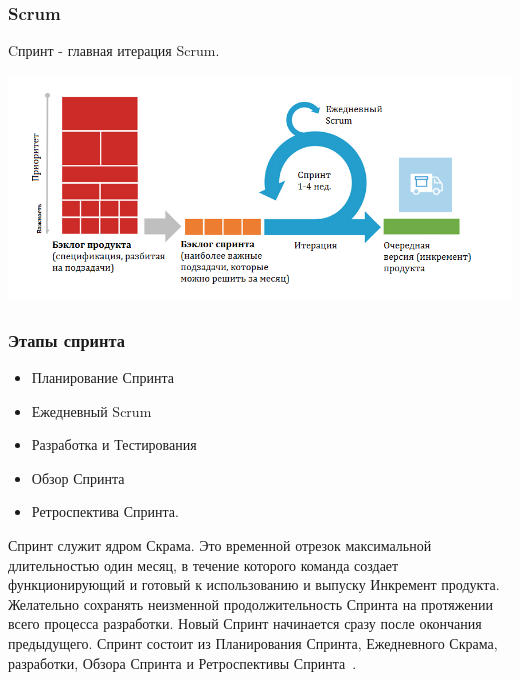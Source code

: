 \documentclass{../industrial-development}
\begin{document}
\begin{frame} \frametitle{Scrum}
Cпринт - главная итерация Scrum.
\centerline{\includegraphics[height=0.6\textheight]{scrum.png}}
\end{frame} 


\begin{frame} \frametitle {Этапы спринта}
\begin{flushright}
\begin{itemize}
\item Планирование Спринта
\item Ежедневный Scrum
\item Разработка и Тестирования
\item Обзор Спринта
\item Ретроспектива Спринта. 
\end {itemize}
\end{flushright}
\end{frame}
\lecturenotes
\begin {block}
Спринт служит ядром Скрама. Это временной отрезок максимальной  длительностью один месяц, в течение которого      команда создает функционирующий и  готовый к использованию и выпуску Инкремент продукта. Желательно сохранять неизменной продолжительность Спринта на протяжении всего  процесса разработки. Новый Спринт начинается сразу после окончания предыдущего. Спринт состоит из Планирования Спринта, Ежедневного Скрама, разработки, Обзора Спринта и Ретроспективы Спринта~\cite{Scrum}. 
\end {block}
\end{document}
